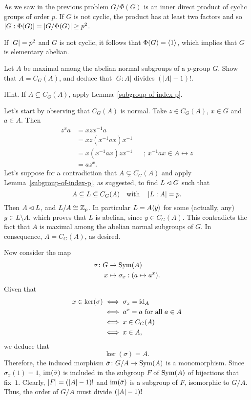 \begin{solution} As we saw in the previous problem $G/\Phi(G)$ is an inner direct product of cyclic groups of order $p$. If $G$ is not cyclic, the product has at least two factors and so $\left\vert{G:\Phi(G)}\right\vert=\left\vert{G/\Phi(G)}\right\vert\ge p^2$.

If $\left\vert{G}\right\vert=p^2$ and $G$ is not cyclic, it follows that $\Phi(G)=\langle1\rangle$, which implies that $G$ is elementary abelian.  \end{solution}

\begin{probl}
    Let $A$ be maximal among the abelian normal subgroups of a $p$-group\/ $G$. Show that $A=C_G(A)$, and deduce that $|G : A|$ divides $(|A| - 1)!$.

    \textrm{\rm Hint. If $A\varsubsetneq C_G(A)$, apply Lemma~\ref{subgroup-of-index-p}.}
\end{probl}

\begin{solution} Let's start by observing that $C_G(A)$ is normal. Take $z\in C_G(A)$, $x\in G$ and $a\in A$. Then
\begin{align*}
     z^xa &= xzx^{-1}a\\
        &=xz(x^{-1}ax)x^{-1}\\
        &= x(x^{-1}ax)zx^{-1} &&\text{; }x^{-1}ax\in A\leftrightarrow z\\
        &= az^x.
\end{align*}
Let's suppose for a contradiction that $A\varsubsetneq C_G(A)$ and apply Lemma~\ref{subgroup-of-index-p}, as suggested, to find $L\lhd G$ such that
$$
    A\subseteq L\subseteq C_G(A)\quad\text{with}\quad \left\vert{L:A}\right\vert=p.
$$
Then $A\lhd L$, and $L/A\cong\mathbb{Z}_p$. In particular $L=A\langle y\rangle$ for some (actually, any) $y\in L\setminus A$, which proves that $L$ is abelian, since $y\in C_G(A)$. This contradicts the fact that $A$ is maximal among the abelian normal subgroups of $G$. In consequence, $A=C_G(A)$, as desired.

Now consider the map
\begin{align*}
    \sigma\colon G&\to{\rm Sym}(A)\\
    x&\mapsto\sigma_x: (a\mapsto a^x).
\end{align*}
Given that
\begin{align*}
    x\in\ker(\sigma) &\iff \sigma_x=\operatorname{id}_A\\
        &\iff a^x=a \text{ for all }a\in A\\
        &\iff x\in C_G(A)\\
        &\iff x\in A,
\end{align*}
we deduce that
$$
    \ker(\sigma) = A.
$$
Therefore, the induced morphism $\bar\sigma\colon G/A\to{\rm Sym}(A)$ is a monomorphism. Since $\sigma_x(1)=1$,
 $\operatorname{im}(\bar\sigma)$ is included in the subgroup $F$ of ${\rm Sym}(A)$ of bijections that fix~$1$. Clearly, $\left\vert{F}\right\vert=(\left\vert{A}\right\vert-1)!$ and $\operatorname{im}(\bar\sigma)$ is a subgroup of $F$, isomorphic to $G/A$. Thus, the order of $G/A$ must divide $(\left\vert{A}\right\vert-1)!$  \end{solution}

